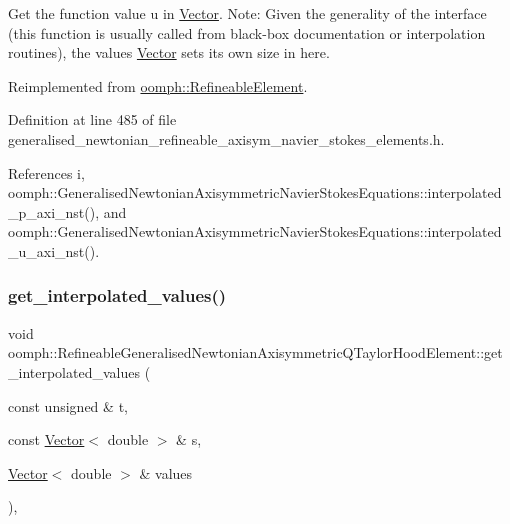 Get the function value u in \hyperlink{classoomph_1_1Vector}{Vector}. Note\+: Given the generality of the interface (this function is usually called from black-\/box documentation or interpolation routines), the values \hyperlink{classoomph_1_1Vector}{Vector} sets its own size in here. 



Reimplemented from \hyperlink{classoomph_1_1RefineableElement_ad9a4f92880668a2373326d8306365c43}{oomph\+::\+Refineable\+Element}.



Definition at line 485 of file generalised\+\_\+newtonian\+\_\+refineable\+\_\+axisym\+\_\+navier\+\_\+stokes\+\_\+elements.\+h.



References i, oomph\+::\+Generalised\+Newtonian\+Axisymmetric\+Navier\+Stokes\+Equations\+::interpolated\+\_\+p\+\_\+axi\+\_\+nst(), and oomph\+::\+Generalised\+Newtonian\+Axisymmetric\+Navier\+Stokes\+Equations\+::interpolated\+\_\+u\+\_\+axi\+\_\+nst().

\mbox{\label{classoomph_1_1RefineableGeneralisedNewtonianAxisymmetricQTaylorHoodElement_a0db7cfb54d889cdfe401e4cc23081a06}} 
\subsubsection{\texorpdfstring{get\+\_\+interpolated\+\_\+values()}{get\_interpolated\_values()}\hspace{0.1cm}{\footnotesize\ttfamily [2/2]}}
{\footnotesize\ttfamily void oomph\+::\+Refineable\+Generalised\+Newtonian\+Axisymmetric\+Q\+Taylor\+Hood\+Element\+::get\+\_\+interpolated\+\_\+values (\begin{DoxyParamCaption}\item[{const unsigned \&}]{t,  }\item[{const \hyperlink{classoomph_1_1Vector}{Vector}$<$ double $>$ \&}]{s,  }\item[{\hyperlink{classoomph_1_1Vector}{Vector}$<$ double $>$ \&}]{values }\end{DoxyParamCaption})\hspace{0.3cm}{\ttfamily [inline]}, {\ttfamily [virtual]}}



